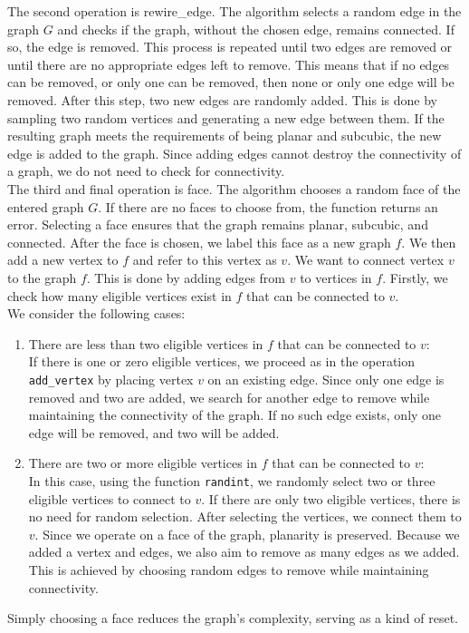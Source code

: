 \documentclass[12pt,a4paper]{amsart}
\theoremstyle{definition}
\theoremstyle{plain}
\begin{document}
The second operation is rewire\_edge. The algorithm selects a random edge in the graph $G$ and checks if the graph, 
without the chosen edge, remains connected. If so, the edge is removed. This process is repeated until two edges are removed 
or until there are no appropriate edges left to remove. This means that if no edges can be removed, or only one can be removed, 
then none or only one edge will be removed. After this step, two new edges are randomly added. This is done by sampling 
two random vertices and generating a new edge between them. If the resulting graph meets the requirements of being planar 
and subcubic, the new edge is added to the graph. Since adding edges cannot destroy the connectivity of a graph, we do not 
need to check for connectivity. \\

The third and final operation is face. The algorithm chooses a random face of the entered graph $G$. If there 
are no faces to choose from, the function returns an error. Selecting a face ensures that the graph remains planar, subcubic, 
and connected. After the face is chosen, we label this face as a new graph $f$. We then add a new vertex to $f$ and refer 
to this vertex as $v$. We want to connect vertex $v$ to the graph $f$. This is done by adding edges from $v$ to vertices 
in $f$. Firstly, we check how many eligible vertices exist in $f$ that can be connected to $v$.\\

We consider the following cases:

\begin{enumerate}
    \item There are less than two eligible vertices in $f$ that can be connected to $v$: \\
    If there is one or zero eligible vertices, we proceed as in the operation \texttt{add\_vertex} by placing vertex $v$ 
    on an existing edge. Since only one edge is removed and two are added, we search for another edge to remove while 
    maintaining the connectivity of the graph. If no such edge exists, only one edge will be removed, and two will be added.

    \item There are two or more eligible vertices in $f$ that can be connected to $v$:\\
    In this case, using the function \texttt{randint}, we randomly select two or three eligible vertices to connect to $v$. 
    If there are only two eligible vertices, there is no need for random selection. After selecting the vertices, we connect 
    them to $v$. Since we operate on a face of the graph, planarity is preserved. Because we added a vertex and edges, we 
    also aim to remove as many edges as we added. This is achieved by choosing random edges to remove while maintaining connectivity.
\end{enumerate}

Simply choosing a face reduces the graph's complexity, serving as a kind of reset.
\end{document}
